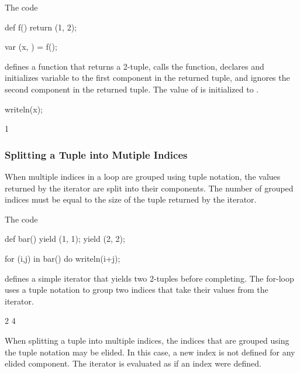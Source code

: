 \begin{example}
\begin{chapelpre}
\end{chapelpre}
The code
\begin{chapel}
def f()
  return (1, 2);

var (x, ) = f();
\end{chapel}
defines a function that returns a 2-tuple, calls the function,
declares and initializes variable  to the first component in
the returned tuple, and ignores the second component in the returned
tuple.  The value of  is initialized to .
\begin{chapelpost}
writeln(x);
\end{chapelpost}
\begin{chapeloutput}
1
\end{chapeloutput}
\end{example}

\subsubsection{Splitting a Tuple into Mutiple Indices}
\label{Indices_in_a_Tuple}

When multiple indices in a loop are grouped using tuple notation, the
values returned by the iterator are split into their components.  The
number of grouped indices must be equal to the size of the tuple
returned by the iterator.

\begin{example}
\begin{chapelpre}
\end{chapelpre}
The code
\begin{chapel}
def bar() {
  yield (1, 1);
  yield (2, 2);
}

for (i,j) in bar() do
  writeln(i+j);
\end{chapel}
defines a simple iterator that yields two 2-tuples before completing.
The for-loop uses a tuple notation to group two indices that take
their values from the iterator.
\begin{chapelpost}
\end{chapelpost}
\begin{chapeloutput}
2
4
\end{chapeloutput}
\end{example}

When splitting a tuple into multiple indices, the indices that are
grouped using the tuple notation may be elided.  In this case, a new
index is not defined for any elided component.  The iterator is
evaluated as if an index were defined.


